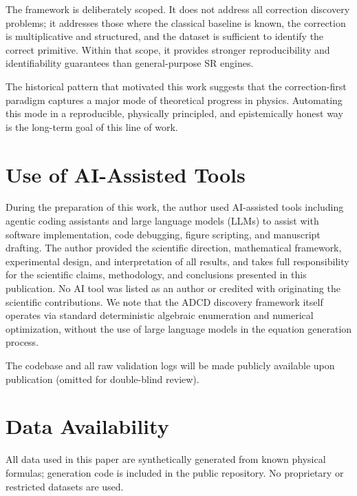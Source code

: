 ﻿\documentclass{article}
\begin{document}
The framework is deliberately scoped.
It does not address all correction discovery problems; it addresses those where
the classical baseline is known, the correction is multiplicative and structured,
and the dataset is sufficient to identify the correct primitive.
Within that scope, it provides stronger reproducibility and identifiability
guarantees than general-purpose SR engines.

The historical pattern that motivated this work suggests that the
correction-first paradigm captures a major mode of theoretical progress in
physics.
Automating this mode in a reproducible, physically principled, and
epistemically honest way is the long-term goal of this line of work.

\section*{Use of AI-Assisted Tools}

During the preparation of this work, the author used AI-assisted tools
including agentic coding assistants and large language models (LLMs) to assist with
software implementation, code debugging, figure scripting, and manuscript drafting.
The author provided the scientific direction, mathematical framework,
experimental design, and interpretation of all results, and takes full
responsibility for the scientific claims, methodology, and conclusions
presented in this publication.
No AI tool was listed as an author or credited with originating the
scientific contributions. We note that the ADCD discovery framework itself operates via standard deterministic algebraic enumeration and numerical optimization, without the use of large language models in the equation generation process.

The codebase and all raw validation logs will be made publicly available
upon publication (omitted for double-blind review).

\section*{Data Availability}

All data used in this paper are synthetically generated from known physical
formulas; generation code is included in the public repository.
No proprietary or restricted datasets are used.

\end{document}
